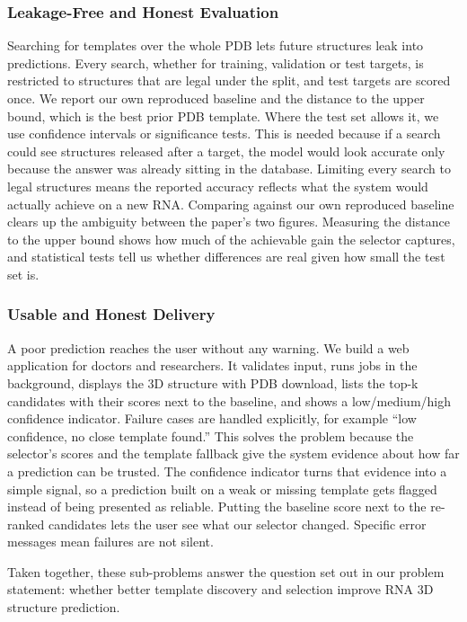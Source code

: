\documentclass{FastFyp}
\begin{document}
\subsubsection{Leakage-Free and Honest Evaluation}
Searching for templates over the whole PDB lets future structures leak into predictions. Every search, whether for training, validation or test targets, is restricted to structures that are legal under the split, and test targets are scored once. We report our own reproduced baseline and the distance to the upper bound, which is the best prior PDB template. Where the test set allows it, we use confidence intervals or significance tests. This is needed because if a search could see structures released after a target, the model would look accurate only because the answer was already sitting in the database. Limiting every search to legal structures means the reported accuracy reflects what the system would actually achieve on a new RNA. Comparing against our own reproduced baseline clears up the ambiguity between the paper's two figures. Measuring the distance to the upper bound shows how much of the achievable gain the selector captures, and statistical tests tell us whether differences are real given how small the test set is.

\subsubsection{Usable and Honest Delivery}
A poor prediction reaches the user without any warning. We build a web application for doctors and researchers. It validates input, runs jobs in the background, displays the 3D structure with PDB download, lists the top-k candidates with their scores next to the baseline, and shows a low/medium/high confidence indicator. Failure cases are handled explicitly, for example ``low confidence, no close template found.'' This solves the problem because the selector's scores and the template fallback give the system evidence about how far a prediction can be trusted. The confidence indicator turns that evidence into a simple signal, so a prediction built on a weak or missing template gets flagged instead of being presented as reliable. Putting the baseline score next to the re-ranked candidates lets the user see what our selector changed. Specific error messages mean failures are not silent.

Taken together, these sub-problems answer the question set out in our problem statement: whether better template discovery and selection improve RNA 3D structure prediction.
\end{document}
